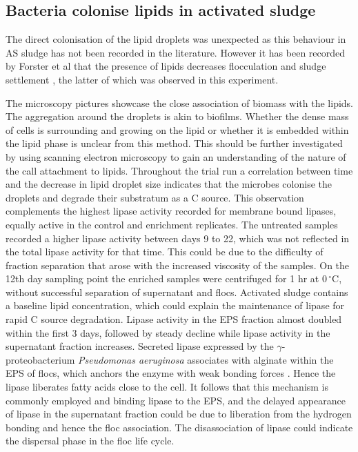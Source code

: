 \documentclass[11pt]{article}
\begin{document}
\subsection{Bacteria colonise lipids in activated sludge}
The direct colonisation of the lipid droplets was unexpected as this behaviour in AS sludge has not been recorded in the literature. However it has been recorded by Forster et al that the presence of lipids decreases flocculation and sludge settlement \cite{Forster_92}, the latter of which was observed in this experiment.

The microscopy pictures showcase the close association of biomass with the lipids. The aggregation around the droplets is akin to biofilms. Whether the dense mass of cells is surrounding and growing on the lipid or whether it is embedded within the lipid phase is unclear from this method. This should be further investigated by using scanning electron microscopy to gain an understanding of the nature of the call attachment to lipids.
Throughout the trial run a correlation between time and the decrease in lipid droplet size indicates that the microbes colonise the droplets and degrade their substratum as a C source. This observation complements the highest lipase activity recorded for membrane bound lipases, equally active in the control and enrichment replicates. The untreated samples recorded a higher lipase activity between days 9 to 22, which was not reflected in the total lipase activity for that time. This could be due to the difficulty of fraction separation that arose with the increased viscosity of the samples. On the 12th day sampling point the enriched samples were centrifuged for 1 hr at $0\,^{\circ}\mathrm{C}$, without successful separation of supernatant and flocs. 
Activated sludge contains a baseline lipid concentration, which could explain the maintenance of lipase for rapid C source degradation. Lipase activity in the EPS fraction almost doubled within the first 3 days, followed by steady decline while lipase activity in the supernatant fraction increases. Secreted lipase expressed by the \emph{$\gamma$}-proteobacterium \textit{Pseudomonas aeruginosa} associates with alginate within the EPS of flocs, which anchors the enzyme with weak bonding forces \cite{mayer1999role,wicker1987}. Hence the lipase  liberates fatty acids close to the cell. It follows that this mechanism is commonly employed and binding lipase to the EPS, and the delayed appearance of lipase in the supernatant fraction could be due to liberation from the hydrogen bonding and hence the floc association. The disassociation of lipase could indicate the dispersal phase in the floc life cycle.
\end{document}
